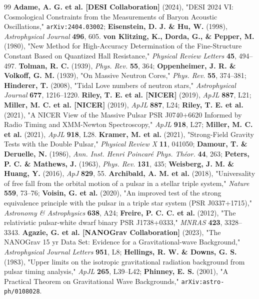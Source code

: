 \documentclass[10pt,a4paper]{article}
\begin{document}
\begin{thebibliography}{99}
 \textbf{Adame, A. G. et al. [DESI Collaboration]} (2024), "DESI 2024 VI: Cosmological Constraints from the Measurements of Baryon Acoustic Oscillations," \texttt{arXiv:2404.03002}; \textbf{Eisenstein, D. J. \& Hu, W.} (1998), \textit{Astrophysical Journal} \textbf{496}, 605.
 \textbf{von Klitzing, K., Dorda, G., \& Pepper, M.} (1980), "New Method for High-Accuracy Determination of the Fine-Structure Constant Based on Quantized Hall Resistance," \textit{Physical Review Letters} \textbf{45}, 494–497.
 \textbf{Tolman, R. C.} (1939), \textit{Phys. Rev.} \textbf{55}, 364; \textbf{Oppenheimer, J. R. \& Volkoff, G. M.} (1939), "On Massive Neutron Cores," \textit{Phys. Rev.} \textbf{55}, 374–381; \textbf{Hinderer, T.} (2008), "Tidal Love numbers of neutron stars," \textit{Astrophysical Journal} \textbf{677}, 1216–1220.
 \textbf{Riley, T. E. et al. [NICER]} (2019), \textit{ApJL} \textbf{887}, L21; \textbf{Miller, M. C. et al. [NICER]} (2019), \textit{ApJL} \textbf{887}, L24; \textbf{Riley, T. E. et al.} (2021), "A NICER View of the Massive Pulsar PSR J0740+6620 Informed by Radio Timing and XMM-Newton Spectroscopy," \textit{ApJL} \textbf{918}, L27; \textbf{Miller, M. C. et al.} (2021), \textit{ApJL} \textbf{918}, L28.
 \textbf{Kramer, M. et al.} (2021), "Strong-Field Gravity Tests with the Double Pulsar," \textit{Physical Review X} \textbf{11}, 041050; \textbf{Damour, T. \& Deruelle, N.} (1986), \textit{Ann. Inst. Henri Poincaré Phys. Théor.} \textbf{44}, 263; \textbf{Peters, P. C. \& Mathews, J.} (1963), \textit{Phys. Rev.} \textbf{131}, 435; \textbf{Weisberg, J. M. \& Huang, Y.} (2016), \textit{ApJ} \textbf{829}, 55.
 \textbf{Archibald, A. M. et al.} (2018), "Universality of free fall from the orbital motion of a pulsar in a stellar triple system," \textit{Nature} \textbf{559}, 73–76; \textbf{Voisin, G. et al.} (2020), "An improved test of the strong equivalence principle with the pulsar in a triple star system (PSR J0337+1715)," \textit{Astronomy \& Astrophysics} \textbf{638}, A24; \textbf{Freire, P. C. C. et al.} (2012), "The relativistic pulsar-white dwarf binary PSR J1738+0333," \textit{MNRAS} \textbf{423}, 3328–3343.
 \textbf{Agazie, G. et al. [NANOGrav Collaboration]} (2023), "The NANOGrav 15 yr Data Set: Evidence for a Gravitational-wave Background," \textit{Astrophysical Journal Letters} \textbf{951}, L8; \textbf{Hellings, R. W. \& Downs, G. S.} (1983), "Upper limits on the isotropic gravitational radiation background from pulsar timing analysis," \textit{ApJL} \textbf{265}, L39–L42; \textbf{Phinney, E. S.} (2001), "A Practical Theorem on Gravitational Wave Backgrounds," \texttt{arXiv:astro-ph/0108028}.

\end{thebibliography}
\end{document}

